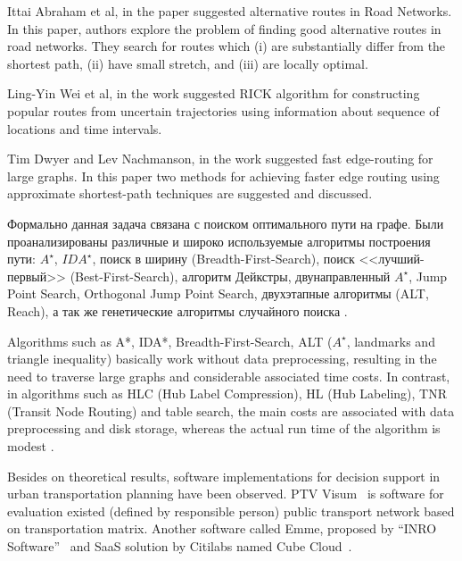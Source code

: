 Ittai Abraham et al, in the paper \cite{abraham2013alternative} suggested alternative routes in Road 
Networks. In this paper, authors explore the problem of finding good alternative routes in road networks. 
They search for routes which (i) are substantially differ from the shortest path, (ii) have small stretch, 
and (iii) are locally optimal. 

Ling-Yin Wei et al, in the work \cite{wei2012constructing} suggested RICK algorithm for constructing 
popular routes from uncertain trajectories using information about sequence of locations and time 
intervals.

Tim Dwyer and Lev Nachmanson, in the work \cite{dwyer2009fast} suggested fast edge-routing for large 
graphs. In this paper two methods for achieving faster edge routing using approximate shortest-path 
techniques are suggested and discussed.

Формально данная задача связана с поиском оптимального пути на графе. Были проанализированы различные и 
широко используемые алгоритмы построения пути: \( A^\star \), \( IDA^\star \), поиск в ширину 
(Breadth-First-Search), поиск <<лучший-первый>> (Best-First-Search), алгоритм Дейкстры, двунаправленный 
\( A^\star \), Jump Point Search, Orthogonal Jump Point Search, двухэтапные алгоритмы (ALT, Reach), а 
так же генетические алгоритмы случайного поиска \cite{bib:19}. 

Algorithms such as A*, IDA*, Breadth-First-Search, ALT (\( A^\star \), landmarks and triangle inequality) 
basically work without data preprocessing, resulting in the need to traverse large graphs and considerable 
associated time costs. In contrast, in algorithms such as HLC (Hub Label Compression), HL (Hub Labeling), 
TNR (Transit Node Routing) and table search, the main costs are associated with data preprocessing and 
disk storage, whereas the actual run time of the algorithm is modest \cite{bib:21}.

Besides on theoretical results, software implementations for decision support in urban transportation 
planning have been observed. PTV Visum~\cite{bib:6} is software for evaluation existed (defined by 
responsible person) public transport network based on transportation matrix. Another software called 
Emme, proposed by ``INRO Software''~\cite{bib:7} and SaaS solution by Citilabs named 
Cube Cloud~\cite{bib:8}.

